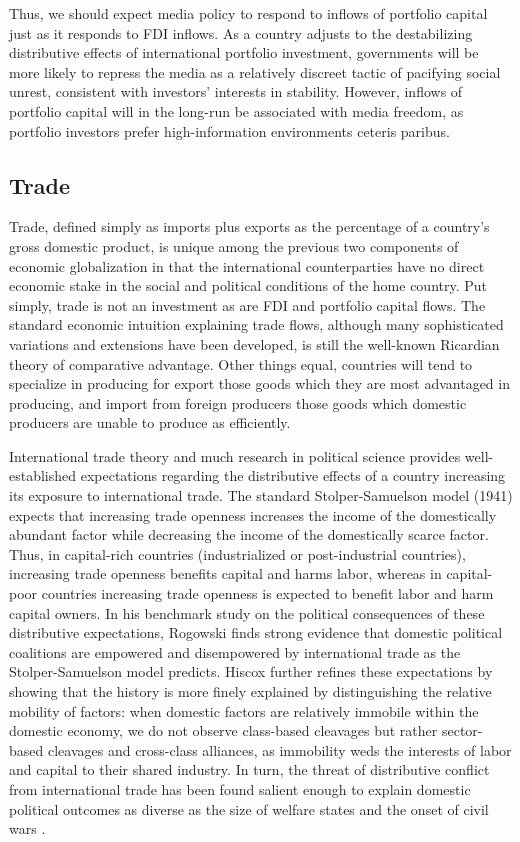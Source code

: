 \documentclass[a4paper]{article}\usepackage[]{graphicx}\usepackage[]{color}
\begin{document}
Thus, we should expect media policy to respond to inflows of portfolio capital just as it responds to FDI inflows. As a country adjusts to the destabilizing distributive effects of international portfolio investment, governments will be more likely to repress the media as a relatively discreet tactic of pacifying social unrest, consistent with investors' interests in stability. However, inflows of portfolio capital will in the long-run be associated with media freedom, as portfolio investors prefer high-information environments ceteris paribus.

\subsection{Trade}

Trade, defined simply as imports plus exports as the percentage of a country's gross domestic product, is unique among the previous two components of economic globalization in that the international counterparties have no direct economic stake in the social and political conditions of the home country. Put simply, trade is not an investment as are FDI and portfolio capital flows. The standard economic intuition explaining trade flows, although many sophisticated variations and extensions have been developed, is still the well-known Ricardian theory of comparative advantage. Other things equal, countries will tend to specialize in producing for export those goods which they are most advantaged in producing, and import from foreign producers those goods which domestic producers are unable to produce as efficiently.

International trade theory and much research in political science provides well-established expectations regarding the distributive effects of a country increasing its exposure to international trade. The standard Stolper-Samuelson model (1941) expects that increasing trade openness increases the income of the domestically abundant factor while decreasing the income of the domestically scarce factor. Thus, in capital-rich countries (industrialized or post-industrial countries), increasing trade openness benefits capital and harms labor, whereas in capital-poor countries increasing trade openness is expected to benefit labor and harm capital owners. In his benchmark study on the political consequences of these distributive expectations, Rogowski \parencite*{Rogowski:1989wm} finds strong evidence that domestic political coalitions are empowered and disempowered by international trade as the Stolper-Samuelson model predicts. Hiscox \parencite*{Hiscox:2002us} further refines these expectations by showing that the history is more finely explained by distinguishing the relative mobility of factors: when domestic factors are relatively immobile within the domestic economy, we do not observe class-based cleavages but rather sector-based cleavages and cross-class alliances, as immobility weds the interests of labor and capital to their shared industry. In turn, the threat of distributive conflict from international trade has been found salient enough to explain domestic political outcomes as diverse as the size of welfare states \parencites{Cameron:1978vb}{Burgoon:2001dp} and the onset of civil wars \parencite{Bussmann:2007vx}.
\end{document}
